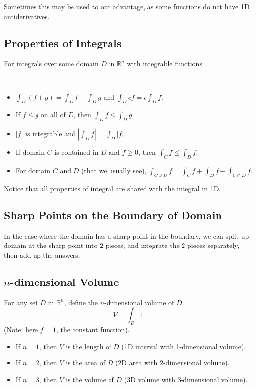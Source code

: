 \documentclass[11pt,fleqn]{book} %
\begin{document}
Sometimes this may be used to our advantage, as some functions do not have 1D antiderivatives.

\subsection*{Properties of Integrals}

For integrals over some domain $D$ in $\mathbb{R}^n$ with integrable functions 

{~~~}

\begin{itemize}
    \item $\int_D(f + g) = \int_D f + \int_D g$ and $\int_D cf = c \int_D f$.
    
    \item If $f \le g$ on all of $D$, then $\int_D f \le \int_D g$. 
    
    \item $|f|$ is integrable and $\left| \int_D f \right| = \int_D |f|$. 

    \item If domain $C$ is contained in $D$ and $f \ge 0$, then $\int_C f \le \int_D f$. 
    
    \item For domain $C$ and $D$ (that we usually see), $\int_{C \cup D} f = \int_C f + \int_D f - \int_{C \cap D} f$. 
\end{itemize}

Notice that all properties of integral are shared with the integral in 1D.

\subsection*{Sharp Points on the Boundary of Domain}

In the case where the domain has a sharp point in the boundary, we can split up domain at the sharp point into 2 pieces, and integrate the 2 pieces separately, then add up the answers.

\subsection*{$n$-dimensional Volume}

For any set $D$ in $\mathbb{R}^n$, define the $n$-dimensional volume of $D$ $$V = \int_D 1$$ (Note: here $f = 1$, the constant function). 

\begin{itemize}
    \item If $n = 1$, then $V$ is the length of $D$ (1D interval with 1-dimensional volume). 
    \item If $n = 2$, then $V$ is the area of $D$ (2D area with 2-dimensional volume). 
    \item If $n = 3$, then $V$ is the volume of $D$ (3D volume with 3-dimensional volume). 
\end{itemize}
\end{document}
